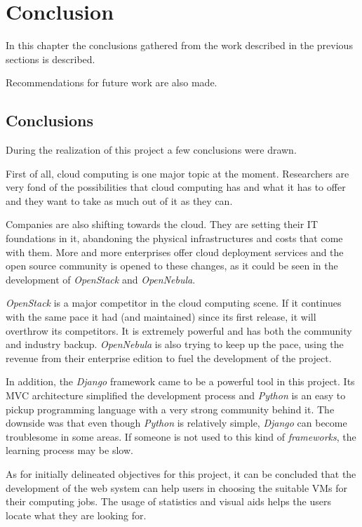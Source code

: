 \chapter{Conclusion} \label{chap:concl}

In this chapter the conclusions gathered from the work described in the previous sections is described. 

Recommendations for future work are also made.

\section{Conclusions}\label{sec:conclusions}

During the realization of this project a few conclusions were drawn.

First of all, cloud computing is one major topic at the moment. Researchers are very fond of the possibilities that cloud computing has and what it has to offer and they want to take as much out of it as they can. 

Companies are also shifting towards the cloud. They are setting their IT foundations in it, abandoning the physical infrastructures and costs that come with them. More and more enterprises offer cloud deployment services and the open source community is opened to these changes, as it could be seen in the development of \textit{OpenStack} and \textit{OpenNebula}.

\textit{OpenStack} is a major competitor in the cloud computing scene. If it continues with the same pace it had (and maintained) since its first release, it will overthrow its competitors. It is extremely powerful and has both the community and industry backup. \textit{OpenNebula} is also trying to keep up the pace, using the revenue from their enterprise edition to fuel the development of the project.

In addition, the \textit{Django} framework came to be a powerful tool in this project. Its MVC architecture simplified the development process and \textit{Python} is an easy to pickup programming language with a very strong community behind it. The downside was that even though \textit{Python} is relatively simple, \textit{Django} can become troublesome in some areas. If someone is not used to this kind of \textit{frameworks}, the learning process may be slow.

As for initially delineated objectives for this project, it can be concluded that the development of the web system can help users in choosing the suitable VMs for their computing jobs. The usage of statistics and visual aids helps the users locate what they are looking for.

